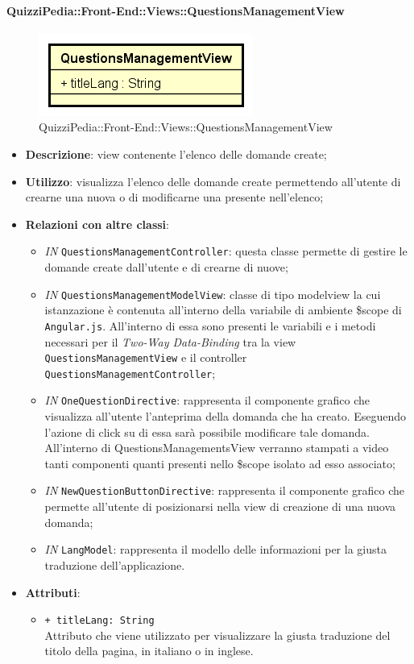\paragraph{QuizziPedia::Front-End::Views::QuestionsManagementView}
\begin{figure} [ht]
	\centering
	\includegraphics[scale=0.80]{UML/Classi/Front-End/QuizziPedia_Front-end_Views_QuestionsManagementView.png}
	\caption{QuizziPedia::Front-End::Views::QuestionsManagementView}
\end{figure} \FloatBarrier
\begin{itemize}
	\item \textbf{Descrizione}: view contenente l'elenco delle domande create; 
	\item \textbf{Utilizzo}: visualizza l'elenco delle domande create permettendo all'utente di crearne una nuova o di modificarne una presente nell'elenco;
	\item \textbf{Relazioni con altre classi}:
	\begin{itemize} 
		\item \textit{IN} \texttt{QuestionsManagementController}: questa classe permette di gestire le domande create dall'utente e di crearne di nuove;
		\item \textit{IN} \texttt{QuestionsManagementModelView}: classe di tipo modelview la cui istanzazione è contenuta all'interno della variabile di ambiente \$scope di \texttt{Angular.js}. All'interno di essa sono presenti le variabili e i metodi necessari per il \textit{Two-Way Data-Binding} tra la view \texttt{QuestionsManagementView} e il controller \texttt{QuestionsManagementController};
		\item \textit{IN} \texttt{OneQuestionDirective}: rappresenta il componente grafico che visualizza all'utente l'anteprima della domanda che ha creato. Eseguendo l'azione di click su di essa sarà possibile modificare tale domanda. All'interno di QuestionsManagementsView verranno stampati a video tanti componenti quanti presenti nello \$scope isolato ad esso associato;
		\item \textit{IN} \texttt{NewQuestionButtonDirective}:  rappresenta il componente grafico che permette all'utente di posizionarsi nella view di creazione di una nuova domanda;
		\item \textit{IN} \texttt{LangModel}: rappresenta il modello delle informazioni per la giusta traduzione dell'applicazione. 
	\end{itemize}
	\item \textbf{Attributi}:
	\begin{itemize}
		\item \texttt{+ titleLang: String} \\ Attributo che viene utilizzato per visualizzare la giusta traduzione del titolo della pagina, in italiano o in inglese.
	\end{itemize}
\end{itemize}


